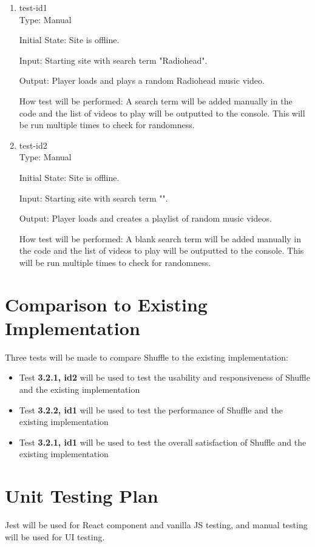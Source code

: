 \documentclass[12pt, titlepage]{article}
\begin{document}
\begin{enumerate}

\item{test-id1\\}
Type: Manual
					
Initial State: Site is offline.
					
Input: Starting site with search term "Radiohead".
					
Output: Player loads and plays a random Radiohead music video.
					
How test will be performed: A search term will be added manually in the code and the list of videos to play will be outputted to the console.  This will be run multiple times to check for randomness.

\item{test-id2\\}
Type: Manual
					
Initial State: Site is offline.
					
Input: Starting site with search term "".
					
Output: Player loads and creates a playlist of random music videos.
					
How test will be performed: A blank search term will be added manually in the code and the list of videos to play will be outputted to the console.  This will be run multiple times to check for randomness.

\end{enumerate}
	
\section{Comparison to Existing Implementation}	
Three tests will be made to compare Shuffle to the existing implementation:
\begin{itemize}
\item Test \color{red}\textbf{3.2.1, id2 }\color{black} will be used to test the usability and responsiveness of Shuffle and the existing implementation
\item Test \color{red}\textbf{3.2.2, id1 }\color{black} will be used to test the performance of Shuffle and the existing implementation
\item Test \color{red}\textbf{3.2.1, id1 }\color{black} will be used to test the overall satisfaction of Shuffle and the existing implementation 
\end{itemize}
\section{Unit Testing Plan}
Jest will be used for React component and vanilla JS testing, and manual testing will be used for UI testing.
		
\end{document}
